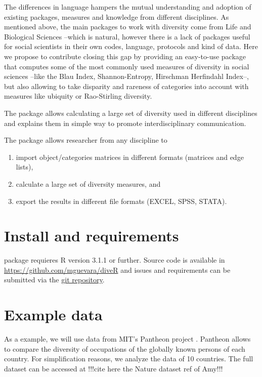 The differences in language hampers the mutual understanding and adoption of existing packages, measures and knowledge from different disciplines. As mentioned above, the main packages to work with diversity come from Life and Biological Sciences --which is natural, however there is a lack of packages useful for social scientists in their own codes, language, protocols and kind of data. Here we propose to contribute closing this gap by providing an easy-to-use package that computes some of the most commonly used measures of diversity in social sciences --like the Blau Index, Shannon-Entropy, Hirschman Herfindahl Index--, but also allowing to take disparity and rareness of categories into account with measures like ubiquity or Rao-Stirling diversity.


The  package allows calculating a large set of diversity used in different disciplines and explains them in simple way to promote interdisciplinary communication.

The  package allows researcher from any discipline to 
\begin{enumerate}
  \item import object/categories matrices in different formats (matrices and edge lists), 
  \item calculate a large set of diversity measures, and 
  \item export the results in different file formats (EXCEL, SPSS, STATA). 
\end{enumerate}




\section{Install and requirements}
 package requieres R version 3.1.1 or further. 
Source code is available in \url{https://github.com/mguevara/diveR} and issues and requirements can be submitted via the \href{https://github.com/mguevara/diveR/issues}{git repository}.

\section{Example data}
As a example, we will use data from MIT's Pantheon project \citep{macroconnections_mit_medialab_pantheon_2014}. Pantheon allows to compare the diversity of occupations of the globally known persons of each country. For simplification reasons, we analyze the data of 10 countries. The full dataset can be accessed at !!!cite here the Nature dataset ref of Amy!!!

